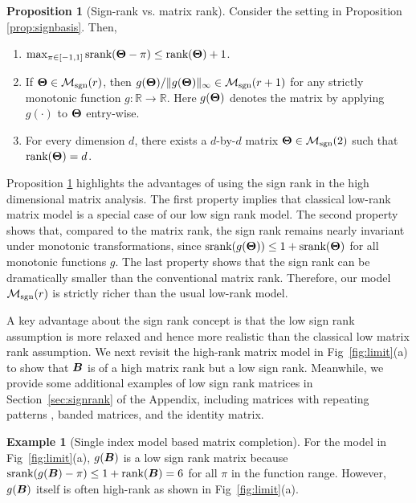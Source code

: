 \documentclass[11pt]{article}
\theoremstyle{plain}
\theoremstyle{definition}
\newtheorem{prop}{Proposition}
\newtheorem{example}{Example}
\def\caliM{\tM_{\textup{sgn}}}
\def\srank{\textup{srank}}
\def\rank{\textup{rank}}
\def\caliM{\tM_{\textup{sgn}}}
\begin{document}
\begin{prop}[Sign-rank vs. matrix rank]\label{prop:signrank} Consider the setting in Proposition \ref{prop:signbasis}. Then,
\begin{enumerate}[label=(\alph*)]
\item $\max_{\pi\in[-1,1]}\srank(\mTheta-\pi)\leq \rank(\mTheta)+1$.
\item If $\mTheta \in \caliM(r)$, then $g(\mTheta)/\mnormSize{}{g(\mTheta)}\in\caliM(r+1)$ for any strictly monotonic function $g\colon \mathbb{R}\to\mathbb{R}$. Here $g(\bm{\Theta})$ denotes the matrix by applying $g(\cdot)$ to $\bm{\Theta}$ entry-wise. 
\item For every dimension $d$, there exists a $d$-by-$d$ matrix $\mTheta\in\caliM(2)$ such that $\rank(\mTheta)= d$.  
\end{enumerate}
\end{prop}

\noindent
Proposition \ref{prop:signrank} highlights the advantages of using the sign rank in the high dimensional matrix analysis. The first property implies that classical low-rank matrix model is a special case of our low sign rank model. The second property shows that, compared to the matrix rank, the sign rank remains nearly invariant under monotonic transformations, since $\srank(g(\mTheta)) \leq 1+\srank(\mTheta)$ for all monotonic functions $g$. The last property shows that the sign rank can be dramatically smaller than the conventional matrix rank. Therefore, our model $\caliM(r)$ is strictly richer than the usual low-rank model. 

A key advantage about the sign rank concept is that the low sign rank assumption is more relaxed and hence more realistic than the classical low matrix rank assumption. We next revisit the high-rank matrix model in Fig~\ref{fig:limit}(a) to show that $\bm B$ is of a high matrix rank but a low sign rank. Meanwhile, we provide some additional examples of low sign rank matrices in Section~\ref{sec:signrank} of the Appendix, including matrices with repeating patterns \citep{chan2014consistent}, banded matrices, and the identity matrix.

\begin{example}[Single index model based matrix completion]
For the model in Fig~\ref{fig:limit}(a), $g(\bm B)$ is a low sign rank matrix because $\srank(g(\mB)-\pi)\leq 1+\rank(\mB)=6$ for all $\pi$ in the function range. However, $g(\bm B)$ itself is often high-rank as shown in Fig~\ref{fig:limit}(a).
\end{example}
\end{document}
